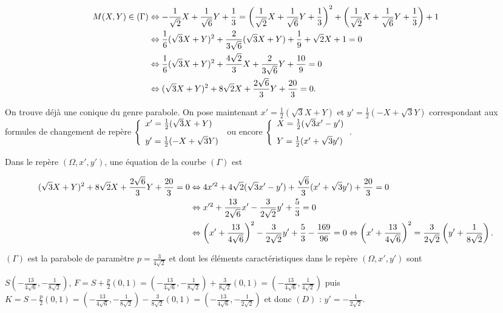 {{\begin{align*}\ensuremath
M(X,Y)\in(\Gamma)&\Leftrightarrow-\frac{1}{\sqrt{2}}X+\frac{1}{\sqrt{6}}Y+\frac{1}{3}=\left(\frac{1}{\sqrt{2}}X+\frac{1}{\sqrt{6}}Y+\frac{1}{3}\right)^2 +\left(\frac{1}{\sqrt{2}}X+\frac{1}{\sqrt{6}}Y+\frac{1}{3}\right)+ 1\\
 &\Leftrightarrow\frac{1}{6}(\sqrt{3}X+Y)^2 + \frac{2}{3\sqrt{6}}(\sqrt{3}X+Y)+\frac{1}{9}+\sqrt{2}X+1=0\\
 &\Leftrightarrow\frac{1}{6}(\sqrt{3}X+Y)^2+\frac{4\sqrt{2}}{3}X+\frac{2}{3\sqrt{6}}Y+\frac{10}{9}=0\\
 &\Leftrightarrow(\sqrt{3}X+Y)^2+8\sqrt{2}X+\frac{2\sqrt{6}}{3}Y+\frac{20}{3}=0.
\end{align*}

On trouve déjà une conique du genre parabole. On pose maintenant $x'=\frac{1}{2}(\sqrt{3}X+Y)$ et $y'=\frac{1}{2}(-X+\sqrt{3}Y)$ correspondant aux formules de changement de repère
$\left\{
\begin{array}{l}
x'=\frac{1}{2}(\sqrt{3}X+Y)\\
\rule{0mm}{6mm}y'=\frac{1}{2}(-X+\sqrt{3}Y)
\end{array}
\right.$    ou encore  $\left\{
\begin{array}{l}
X=\frac{1}{2}(\sqrt{3}x'-y')\\
\rule{0mm}{6mm}Y=\frac{1}{2}(x'+\sqrt{3}y')
\end{array}
\right.$.

Dans le repère $(\Omega,x',y')$, une équation de la courbe $(\Gamma)$ est

\begin{align*}\ensuremath
(\sqrt{3}X+Y)^2+8\sqrt{2}X+\frac{2\sqrt{6}}{3}Y+\frac{20}{3}=0&\Leftrightarrow4x'^2+4\sqrt{2}(\sqrt{3}x'-y')+\frac{\sqrt{6}}{3}(x'+\sqrt{3}y')+\frac{20}{3}=0\\
 &\Leftrightarrow x'^2+\frac{13}{2\sqrt{6}}x'-\frac{3}{2\sqrt{2}}y'+\frac{5}{3}=0\\
 &\Leftrightarrow\left(x'+\frac{13}{4\sqrt{6}}\right)^2-\frac{3}{2\sqrt{2}}y'+\frac{5}{3}-\frac{169}{96}=0\Leftrightarrow\left(x'+\frac{13}{4\sqrt{6}}\right)^2=\frac{3}{2\sqrt{2}}\left(y'+\frac{1}{8\sqrt{2}}\right).
\end{align*}

$(\Gamma)$ est la parabole de paramètre $p=\frac{3}{4\sqrt{2}}$ et dont les éléments caractéristiques dans le repère $(\Omega,x',y')$ sont 

$S\left(-\frac{13}{4\sqrt{6}},-\frac{1}{8\sqrt{2}}\right)$, $F = S +\frac{p}{2}(0,1)=\left(-\frac{13}{4\sqrt{6}},-\frac{1}{8\sqrt{2}}\right)+\frac{3}{8\sqrt{2}}(0,1)=\left(-\frac{13}{4\sqrt{6}},\frac{1}{4\sqrt{2}}\right)$   
puis $K= S-\frac{p}{2}(0,1)=\left(-\frac{13}{4\sqrt{6}},-\frac{1}{8\sqrt{2}}\right)-\frac{3}{8\sqrt{2}}(0,1)=\left(-\frac{13}{4\sqrt{6}},-\frac{1}{2\sqrt{2}}\right)$ et  donc $(D)$ : $y'= -\frac{1}{2\sqrt{2}}$.

}}
